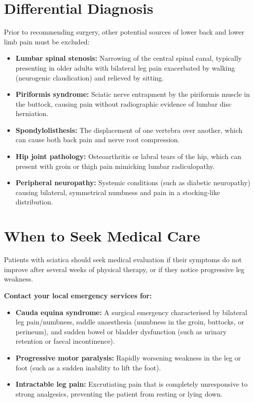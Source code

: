 \section*{Differential Diagnosis}
Prior to recommending surgery, other potential sources of lower back and lower limb pain must be excluded:
\begin{itemize}
    \item \textbf{Lumbar spinal stenosis:} Narrowing of the central spinal canal, typically presenting in older adults with bilateral leg pain exacerbated by walking (neurogenic claudication) and relieved by sitting.
    \item \textbf{Piriformis syndrome:} Sciatic nerve entrapment by the piriformis muscle in the buttock, causing pain without radiographic evidence of lumbar disc herniation.
    \item \textbf{Spondylolisthesis:} The displacement of one vertebra over another, which can cause both back pain and nerve root compression.
    \item \textbf{Hip joint pathology:} Osteoarthritis or labral tears of the hip, which can present with groin or thigh pain mimicking lumbar radiculopathy.
    \item \textbf{Peripheral neuropathy:} Systemic conditions (such as diabetic neuropathy) causing bilateral, symmetrical numbness and pain in a stocking-like distribution.
\end{itemize}

\section*{When to Seek Medical Care}
Patients with sciatica should seek medical evaluation if their symptoms do not improve after several weeks of physical therapy, or if they notice progressive leg weakness.

\textbf{Contact your local emergency services for:}
\begin{itemize}
    \item \textbf{Cauda equina syndrome:} A surgical emergency characterised by bilateral leg pain/numbness, saddle anaesthesia (numbness in the groin, buttocks, or perineum), and sudden bowel or bladder dysfunction (such as urinary retention or faecal incontinence).
    \item \textbf{Progressive motor paralysis:} Rapidly worsening weakness in the leg or foot (such as a sudden inability to lift the foot).
    \item \textbf{Intractable leg pain:} Excrutiating pain that is completely unresponsive to strong analgesics, preventing the patient from resting or lying down.
\end{itemize}

